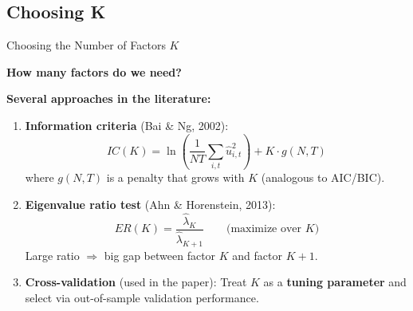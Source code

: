 \documentclass[aspectratio=169]{beamer}
\begin{document}
\subsection{Choosing K}
%
\begin{frame}{Choosing the Number of Factors $K$}

\textbf{How many factors do we need?}

\vspace{0.5em}
\textbf{Several approaches in the literature:}
\begin{enumerate}
    \item \textbf{Information criteria} (Bai \& Ng, 2002):
    \[
    IC(K) = \ln\left(\frac{1}{NT}\sum_{i,t}\hat{u}_{i,t}^2\right) + K \cdot g(N,T)
    \]
    where $g(N,T)$ is a penalty that grows with $K$ (analogous to AIC/BIC).
    
    \vspace{0.3em}
    \item \textbf{Eigenvalue ratio test} (Ahn \& Horenstein, 2013):
    \[
    ER(K) = \frac{\hat{\lambda}_K}{\hat{\lambda}_{K+1}} \qquad \text{(maximize over } K\text{)}
    \]
    Large ratio $\Rightarrow$ big gap between factor $K$ and factor $K+1$.
    
    \vspace{0.3em}
    \item \textbf{Cross-validation} (used in the paper):
    Treat $K$ as a \textbf{tuning parameter} and select via out-of-sample validation performance.
\end{enumerate}
\end{frame}
%
%
\end{document}
